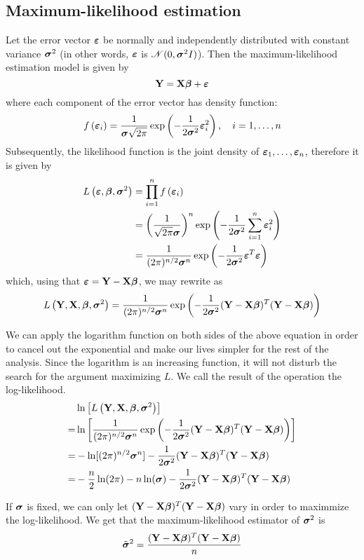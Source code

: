 \subsection{Maximum-likelihood estimation}
Let the error vector \(\boldsymbol{\varepsilon}\) be normally and independently distributed with constant variance \(\boldsymbol{\sigma}^2\) (in other words, \(\boldsymbol{\varepsilon}\) is \(\mathscr{N}(0, \boldsymbol{\sigma}^2 I)\)). Then the maximum-likelihood estimation model is given by
\[
    \mathbf{Y} = \mathbf{X} \boldsymbol{\beta} + \boldsymbol{\varepsilon}
\]
where each component of the error vector has density function:
\[
    f \left(\boldsymbol{\varepsilon}_{i}\right) = \frac{1}{\boldsymbol{\sigma} \sqrt{2 \pi}} \exp \left(-\frac{1}{2 \boldsymbol{\sigma}^{2}} \boldsymbol{\varepsilon}_{i}^{2}\right), \quad i = 1, \ldots, n
\]
Subsequently, the likelihood function is the joint density of \(\boldsymbol{\varepsilon}_1, \ldots, \boldsymbol{\varepsilon}_n\), therefore it is given by
\begin{align*}
    L\left(\boldsymbol{\varepsilon}, \boldsymbol{\beta}, \boldsymbol{\sigma}^{2}\right)
     & = \prod_{i=1}^{n} f\left(\boldsymbol{\varepsilon}_{i}\right)                                                                        \\
     & = \left( \frac{1}{\sqrt{2 \pi} \boldsymbol{\sigma}} \right)^n \exp \left(-\frac{1}{2 \boldsymbol{\sigma}^{2}} \sum_{i=1}^{n} \boldsymbol{\varepsilon}_i^2 \right) \\
     & = \frac{1}{(2 \pi)^{n / 2} \boldsymbol{\sigma}^{n}} \exp \left(-\frac{1}{2 \boldsymbol{\sigma}^{2}} \boldsymbol{\varepsilon}^T \boldsymbol{\varepsilon}\right)                        \\
\end{align*}
which, using that \(\boldsymbol{\varepsilon} = \mathbf{Y} - \mathbf{X} \boldsymbol{\beta}\), we may rewrite as
\[
    L\left(\mathbf{Y}, \mathbf{X}, \boldsymbol{\beta}, \boldsymbol{\sigma}^{2}\right) = \frac{1}{(2 \pi)^{n / 2} \boldsymbol{\sigma}^{n}} \exp \left(-\frac{1}{2 \boldsymbol{\sigma}^{2}} ( \mathbf{Y} - \mathbf{X} \boldsymbol{\beta} )^T ( \mathbf{Y} - \mathbf{X} \boldsymbol{\beta} )\right)
\]

We can apply the logarithm function on both sides of the above equation in order to cancel out the exponential and make our lives simpler for the rest of the analysis. Since the logarithm is an increasing function, it will not disturb the search for the argument maximizing \(L\). We call the result of the operation the log-likelihood.
\begin{align*}
      & \ln \left[ L\left(\mathbf{Y}, \mathbf{X}, \boldsymbol{\beta}, \boldsymbol{\sigma}^{2}\right) \right]                                                                           \\
    = & \ln \left[ \frac{1}{(2 \pi)^{n / 2} \boldsymbol{\sigma}^{n}} \exp \left(-\frac{1}{2 \boldsymbol{\sigma}^{2}} ( \mathbf{Y} - \mathbf{X} \boldsymbol{\beta} )^T ( \mathbf{Y} - \mathbf{X} \boldsymbol{\beta} )\right) \right] \\
    = & - \ln [ (2 \pi)^{n / 2} \boldsymbol{\sigma}^{n} ] - \frac{1}{2 \boldsymbol{\sigma}^{2}} ( \mathbf{Y} - \mathbf{X} \boldsymbol{\beta} )^T ( \mathbf{Y} - \mathbf{X} \boldsymbol{\beta} )                                     \\
    = & - \frac{n}{2} \ln(2 \pi) -n \ln(\boldsymbol{\sigma}) - \frac{1}{2 \boldsymbol{\sigma}^{2}} ( \mathbf{Y} - \mathbf{X} \boldsymbol{\beta} )^T ( \mathbf{Y} - \mathbf{X} \boldsymbol{\beta} )                                  \\
\end{align*}

If \(\boldsymbol{\sigma}\) is fixed, we can only let \(( \mathbf{Y} - \mathbf{X} \boldsymbol{\beta} )^T ( \mathbf{Y} - \mathbf{X} \boldsymbol{\beta} )\) vary in order to maximmize the log-likelihood. We get that the maximum-likelihood estimator of \(\boldsymbol{\sigma}^2\) is
\[
    \tilde {\boldsymbol{\sigma}}^2 = \frac{( \mathbf{Y} - \mathbf{X} \boldsymbol{\beta} )^T ( \mathbf{Y} - \mathbf{X} \boldsymbol{\beta} )}{n}
\]